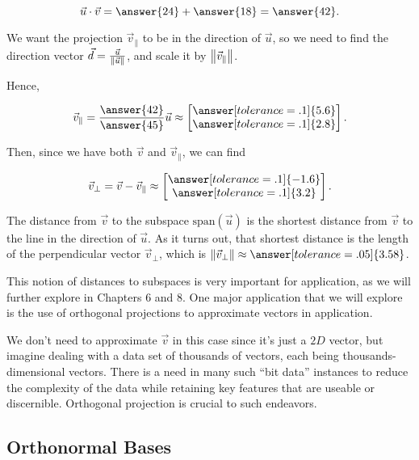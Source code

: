 \documentclass{ximera}
\begin{document}
\begin{exploration}
\begin{example}
      $$\vec{u}\cdot\vec{v}=\answer{24}+\answer{18}=\answer{42}.$$

      We want the projection $\vec{v}_\parallel$ to be in the direction of $\vec{u}$, so we need to find the direction vector $\vec{d}=\frac{\vec{u}}{\left\|\vec{u}\right\|}$, and scale it by $\left\|\vec{v}_\parallel\right\|$.

      Hence, 

      $$\vec{v}_\parallel=\frac{\answer{42}}{\answer{45}}\vec{u}\approx\begin{bmatrix}
         \answer[tolerance=.1]{5.6}\\\answer[tolerance=.1]{2.8}
      \end{bmatrix}.$$

      Then, since we have both $\vec{v}$ and $\vec{v}_\parallel$, we can find 
      
      $$\vec{v}_\perp=\vec{v}-\vec{v}_\parallel\approx \begin{bmatrix}
         \answer[tolerance=.1]{-1.6}\\\answer[tolerance=.1]{3.2}
      \end{bmatrix}.$$

      The distance from $\vec{v}$ to the subspace $\mbox{span}(\vec{u})$ is the shortest distance from $\vec{v}$ to the line in the direction of $\vec{u}$. As it turns out, that shortest distance is the length of the perpendicular vector $\vec{v}_\perp$, which is $\norm{\vec{v}_\perp}\approx\answer[tolerance=.05]{3.58}$.
      
      \end{example}

   This notion of distances to subspaces is very important for application, as we will further explore in Chapters 6 and 8. One major application that we will explore is the use of orthogonal projections to approximate vectors in application. 

   We don't need to approximate $\vec{v}$ in this case since it's just a $2D$ vector, but imagine dealing with a data set of thousands of vectors, each being thousands-dimensional vectors. There is a need in many such ``bit data'' instances to reduce the complexity of the data while retaining key features that are useable or discernible. Orthogonal projection is crucial to such endeavors.


\end{exploration}

\subsection*{Orthonormal Bases}
\end{document}
